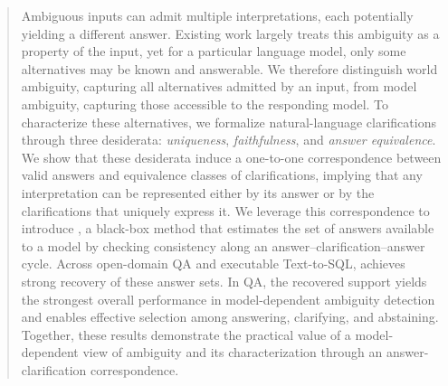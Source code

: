 \begin{abstract}
 Ambiguous inputs can admit multiple interpretations, each potentially yielding a different answer. Existing work largely treats this ambiguity as a property of the input, yet for a particular language model, only some alternatives may be known and answerable. We therefore distinguish world ambiguity, capturing all alternatives admitted by an input, from model ambiguity, capturing those accessible to the responding model. To characterize these alternatives, we formalize natural-language clarifications through three desiderata: \emph{uniqueness}, \emph{faithfulness}, and \emph{answer equivalence}. We show that these desiderata induce a one-to-one correspondence between valid answers and equivalence classes of clarifications, implying that any interpretation can be represented either by its answer or by the clarifications that uniquely express it. We leverage this correspondence to introduce \circleclar{}, a black-box method that estimates the set of answers available to a model by checking consistency along an answer--clarification--answer cycle. Across open-domain QA and executable Text-to-SQL, \circleclar{} achieves strong recovery of these answer sets. In QA, the recovered support yields the strongest overall performance in model-dependent ambiguity detection and enables effective selection among answering, clarifying, and abstaining. Together, these results demonstrate the practical value of a model-dependent view of ambiguity and its characterization through an answer-clarification correspondence.



\end{abstract}
